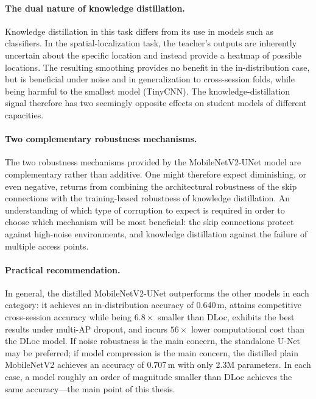 \paragraph{The dual nature of knowledge distillation.} Knowledge distillation in this task differs from
its use in models such as classifiers. In the spatial-localization task, the teacher's outputs are
inherently uncertain about the specific location and instead provide a heatmap of possible locations.
The resulting smoothing provides no benefit in the in-distribution case, but is beneficial under noise
and in generalization to cross-session folds, while being harmful to the smallest model (TinyCNN). The
knowledge-distillation signal therefore has two seemingly opposite effects on student models of different
capacities.

\paragraph{Two complementary robustness mechanisms.} The two robustness mechanisms provided by the
MobileNetV2-UNet model are complementary rather than additive. One might therefore expect diminishing, or
even negative, returns from combining the architectural robustness of the skip connections with the
training-based robustness of knowledge distillation. An understanding of which type of corruption to
expect is required in order to choose which mechanism will be most beneficial: the skip connections
protect against high-noise environments, and knowledge distillation against the failure of multiple
access points.

\paragraph{Practical recommendation.} In general, the distilled MobileNetV2-UNet outperforms the other
models in each category: it achieves an in-distribution accuracy of 0.640\,m, attains competitive
cross-session accuracy while being $6.8\times$ smaller than DLoc, exhibits the best results under multi-AP
dropout, and incurs $56\times$ lower computational cost than the DLoc model. If noise robustness is the
main concern, the standalone U-Net may be preferred; if model compression is the main concern, the
distilled plain MobileNetV2 achieves an accuracy of 0.707\,m with only 2.3M parameters. In each case, a
model roughly an order of magnitude smaller than DLoc achieves the same accuracy---the main point of this
thesis.
